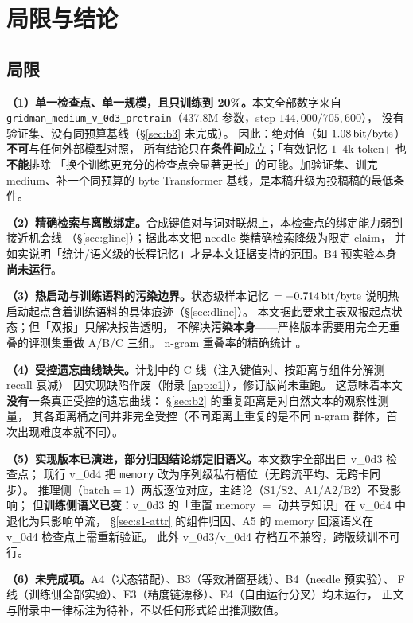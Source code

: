 \section{局限与结论}\label{sec:limits}

\subsection{局限}\label{sec:limitations}

\textbf{（1）单一检查点、单一规模，且只训练到 20\%。}本文全部数字来自
\texttt{gridman\_medium\_v\_0d3\_pretrain}（437.8M 参数，step $144{,}000/705{,}600$），
没有验证集、没有同预算基线（\S\ref{sec:b3} 未完成）。
因此：绝对值（如 $1.08\,\mathrm{bit/byte}$）\textbf{不可}与任何外部模型对照，
所有结论只在\textbf{条件间}成立；「有效记忆 $1$--$4$k token」也\textbf{不能}排除
「换个训练更充分的检查点会显著更长」的可能。加验证集、训完 medium、补一个同预算的
byte Transformer 基线，是本稿升级为投稿稿的最低条件。

\textbf{（2）精确检索与离散绑定。}合成键值对与词对联想上，本检查点的绑定能力弱到接近机会线
（\S\ref{sec:gline}）；据此本文把 needle 类精确检索降级为限定 claim，
并如实说明「统计/语义级的长程记忆」才是本文证据支持的范围。B4 预实验本身\textbf{尚未运行}。

\textbf{（3）热启动与训练语料的污染边界。}状态级样本记忆 $=-0.714\,\mathrm{bit/byte}$
说明热启动起点含着训练语料的具体痕迹（\S\ref{sec:dline}）。
本文据此要求主表双报起点状态；但「双报」只解决报告透明，
不解决\textbf{污染本身}——严格版本需要用完全无重叠的评测集重做 A/B/C 三组。
$\mathrm{n}$-gram 重叠率的精确统计 。

\textbf{（4）受控遗忘曲线缺失。}计划中的 C 线（注入键值对、按距离与组件分解测 recall 衰减）
因实现缺陷作废（附录 \ref{app:c1}），修订版尚未重跑。
这意味着本文\textbf{没有}一条真正受控的遗忘曲线：
\S\ref{sec:b2} 的重复距离是对自然文本的观察性测量，
其各距离桶之间并非完全受控（不同距离上重复的是不同 $\mathrm{n}$-gram 群体，首次出现难度本就不同）。

\textbf{（5）实现版本已演进，部分归因结论绑定旧语义。}本文数字全部出自 v\_0d3 检查点；
现行 v\_0d4 把 \texttt{memory} 改为序列级私有槽位（无跨流平均、无跨卡同步）。
推理侧（$\mathrm{batch}=1$）两版逐位对应，主结论（S1/S2、A1/A2/B2）不受影响；
但\textbf{训练侧语义已变}：v\_0d3 的「重置 memory $=$ 动共享知识」在 v\_0d4 中退化为只影响单流，
\S\ref{sec:s1-attr} 的组件归因、A5 的 memory 回滚语义在 v\_0d4 检查点上需重新验证。
此外 v\_0d3/v\_0d4 存档互不兼容，跨版续训不可行。

\textbf{（6）未完成项。}A4（状态错配）、B3（等效滑窗基线）、B4（needle 预实验）、
F 线（训练侧全部实验）、E3（精度链漂移）、E4（自由运行分叉）均未运行，
正文与附录中一律标注为待补，不以任何形式给出推测数值。


